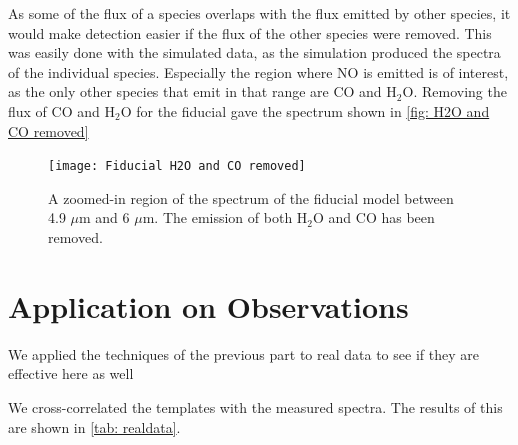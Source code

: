 \documentclass[twoside, single, authoryear, semicolon]{lion-msc}
\newcommand{\4}{$_4$}
\newcommand{\3}{$_3$}
\newcommand{\2}{$_2$}
\begin{document}





As some of the flux of a species overlaps with the flux emitted by other species, it would make detection easier if the flux of the other species were removed. This was easily done with the simulated data, as the simulation produced the spectra of the individual species. Especially the region where NO is emitted is of interest, as the only other species that emit in that range are CO and H\2O. Removing the flux of CO and H\2O for the fiducial gave the spectrum shown in \autoref{fig: H2O and CO removed}

\begin{figure}
    \centering
    \texttt{[image: Fiducial H2O and CO removed]}
    \caption{A zoomed-in region of the spectrum of the fiducial model between 4.9 $\mu$m and 6 $\mu$m. The emission of both H\2O and CO has been removed.}
    \label{fig: H2O and CO removed}
\end{figure}

\section{Application on Observations}
We applied the techniques of the previous part to real data to see if they are effective here as well

We cross-correlated the templates with the measured spectra. The results of this are shown in \autoref{tab: realdata}.
\end{document}
